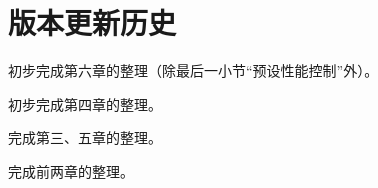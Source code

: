 \chapter*{版本更新历史}


\begin{change}
  \item 初步完成第六章的整理（除最后一小节“预设性能控制”外）。
\end{change}


\begin{change}
  \item 初步完成第四章的整理。
\end{change}


\begin{change}
  \item 完成第三、五章的整理。
\end{change}


\begin{change}
  \item 完成前两章的整理。
\end{change}